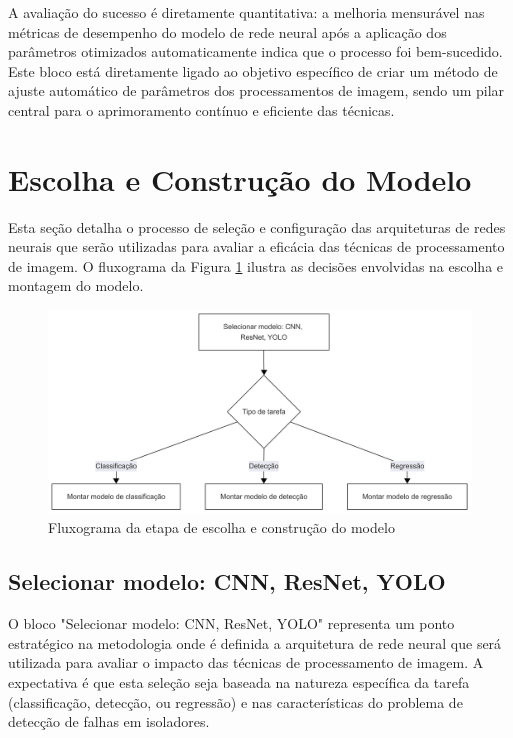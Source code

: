 A avaliação do sucesso é diretamente quantitativa: a melhoria mensurável nas métricas de desempenho do modelo de rede neural após a aplicação dos parâmetros otimizados automaticamente indica que o processo foi bem-sucedido. Este bloco está diretamente ligado ao objetivo específico de criar um método de ajuste automático de parâmetros dos processamentos de imagem, sendo um pilar central para o aprimoramento contínuo e eficiente das técnicas.

\section{Escolha e Construção do Modelo}

Esta seção detalha o processo de seleção e configuração das arquiteturas de redes neurais que serão utilizadas para avaliar a eficácia das técnicas de processamento de imagem. O fluxograma da Figura \ref{fig:fluxograma_escolha_modelo} ilustra as decisões envolvidas na escolha e montagem do modelo.

\begin{figure}[H]
    \centering
    \caption{\label{fig:fluxograma_escolha_modelo}Fluxograma da etapa de escolha e construção do modelo}
    \includegraphics[width=1\textwidth]{img/metodologia - 4 - escolha e construção do modelo.png}
\end{figure}

\subsection{Selecionar modelo: CNN, ResNet, YOLO}
O bloco "Selecionar modelo: CNN, ResNet, YOLO" representa um ponto estratégico na metodologia onde é definida a arquitetura de rede neural que será utilizada para avaliar o impacto das técnicas de processamento de imagem. A expectativa é que esta seleção seja baseada na natureza específica da tarefa (classificação, detecção, ou regressão) e nas características do problema de detecção de falhas em isoladores.

